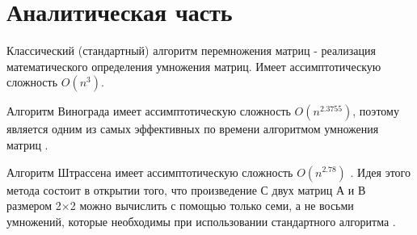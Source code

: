 \section{Аналитическая часть}

Классический (стандартный) алгоритм перемножения матриц - реализация математического определения умножения матриц.
Имеет ассимптотическую сложность \(O(n^{3})\).

Алгоритм Винограда имеет ассимптотическую сложность \(O(n^{2.3755})\), поэтому является одним из самых эффективных по времени алгоритмом умножения матриц \cite{Виноград}. 

Алгоритм Штрассена имеет ассимптотическую сложность \(O(n^{2.78})\) \cite{Ultra-Fast}. 
Идея этого метода состоит в открытии того, что произведение С двух матриц А и В размером 2×2 можно вычислить с помощью только семи, а не восьми умножений, которые необходимы при использовании стандартного алгоритма \cite{Штрассен}.